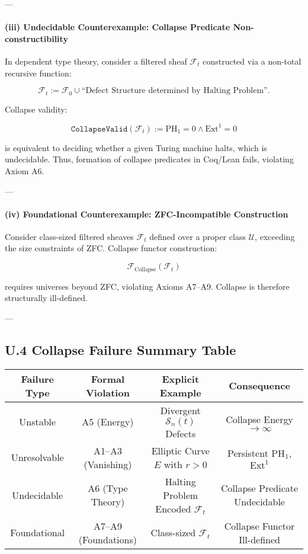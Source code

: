\documentclass[11pt]{article}
\begin{document}
---

\paragraph{(iii) Undecidable Counterexample: Collapse Predicate Non-constructibility}

In dependent type theory, consider a filtered sheaf $\mathcal{F}_t$ constructed via a non-total recursive function:

\[
\mathcal{F}_t := \mathcal{F}_0 \cup \text{``Defect Structure determined by Halting Problem''}.
\]

Collapse validity:

\[
\texttt{CollapseValid}(\mathcal{F}_t) := \mathrm{PH}_1 = 0 \wedge \mathrm{Ext}^1 = 0
\]

is equivalent to deciding whether a given Turing machine halts, which is undecidable.  
Thus, formation of collapse predicates in Coq/Lean fails, violating Axiom A6.

---

\paragraph{(iv) Foundational Counterexample: ZFC-Incompatible Construction}

Consider class-sized filtered sheaves $\mathcal{F}_t$ defined over a proper class $\mathcal{U}$, exceeding the size constraints of ZFC.  
Collapse functor construction:

\[
\mathcal{F}_{\mathrm{Collapse}}(\mathcal{F}_t)
\]

requires universes beyond ZFC, violating Axioms A7–A9.  
Collapse is therefore structurally ill-defined.

---

\subsection*{U.4 Collapse Failure Summary Table}

\begin{center}
\begin{tabular}{|c|c|c|c|}
\hline
\textbf{Failure Type} & \textbf{Formal Violation} & \textbf{Explicit Example} & \textbf{Consequence} \\
\hline
Unstable & A5 (Energy) & Divergent $\mathcal{S}_n(t)$ Defects & Collapse Energy $\to \infty$ \\
Unresolvable & A1–A3 (Vanishing) & Elliptic Curve $E$ with $r>0$ & Persistent $\mathrm{PH}_1$, $\mathrm{Ext}^1$ \\
Undecidable & A6 (Type Theory) & Halting Problem Encoded $\mathcal{F}_t$ & Collapse Predicate Undecidable \\
Foundational & A7–A9 (Foundations) & Class-sized $\mathcal{F}_t$ & Collapse Functor Ill-defined \\
\hline
\end{tabular}
\end{center}
\end{document}
